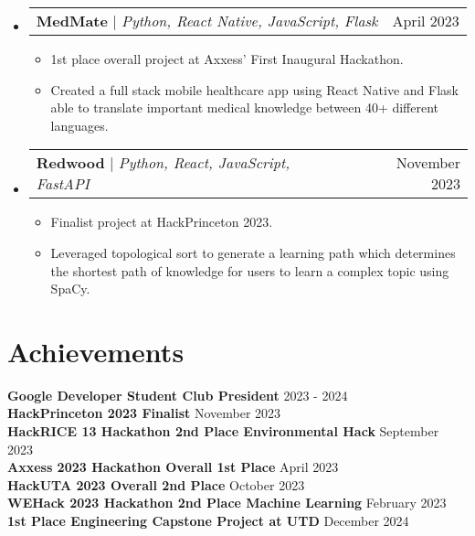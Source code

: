 \documentclass[11pt,letterpaper]{article}%
\makeatletter
\newcommand{\resumeItem}[1]{
  \item\small{
    {#1 \vspace{-2pt}}
  }
}
\newcommand{\resumeProjectHeading}[2]{
    \item
    \begin{tabular*}{0.97\textwidth}{l@{\extracolsep{\fill}}r}
      \small#1 & #2 \\
    \end{tabular*}\vspace{-3pt}
}
\newcommand{\resumeSubHeadingListStart}{\begin{itemize}[leftmargin=0.15in, label={}]}
\newcommand{\resumeSubHeadingListEnd}{\end{itemize}}
\newcommand{\resumeItemListStart}{\begin{itemize}}
\newcommand{\resumeItemListEnd}{\end{itemize}\vspace{-5pt}}
\makeatother
\begin{document}
  \resumeSubHeadingListStart
      \vspace{-5pt}
%
      \resumeProjectHeading
%
          {\textbf{MedMate} $|$ \emph{Python, React Native, JavaScript, Flask}}{April 2023}
%
          \resumeItemListStart
%
            \resumeItem{1st place overall project at Axxess' First Inaugural Hackathon.}
%
            \resumeItem{Created a full stack mobile healthcare app using React Native and Flask able to translate important medical knowledge between 40+ different languages.}
%
          \resumeItemListEnd

      \vspace{-5pt}
%
      \resumeProjectHeading
%
          {\textbf{Redwood} $|$ \emph{Python, React, JavaScript, FastAPI}}{November 2023}
%
          \resumeItemListStart
%
            \resumeItem{Finalist project at HackPrinceton 2023.}
%
            \resumeItem{Leveraged topological sort to generate a learning path which determines the shortest path of knowledge for users to learn a complex topic using SpaCy.}
%
          \resumeItemListEnd
%
    \resumeSubHeadingListEnd

%
%
\section{Achievements}
%
 \begin{itemize}[leftmargin=0.15in, label={}]
%
    \small{\item{
    
    \textbf{Google Developer Student Club President} \hfill {2023 {-} 2024} \\
%
     \textbf{HackPrinceton 2023 Finalist} \hfill {November 2023} \\

     \textbf{HackRICE 13 Hackathon 2nd Place Environmental Hack} \hfill {September 2023} \\
%
     \textbf{Axxess 2023 Hackathon Overall 1st Place} \hfill {April 2023} \\
%
     \textbf{HackUTA 2023 Overall 2nd Place} \hfill {October 2023} \\
%
     \textbf{WEHack 2023 Hackathon 2nd Place Machine Learning} \hfill {February 2023} \\
%

     \textbf{1st Place Engineering Capstone Project at UTD} \hfill {December 2024} \\
%
    }}
%
 \end{itemize}
%

%
\end{document}
